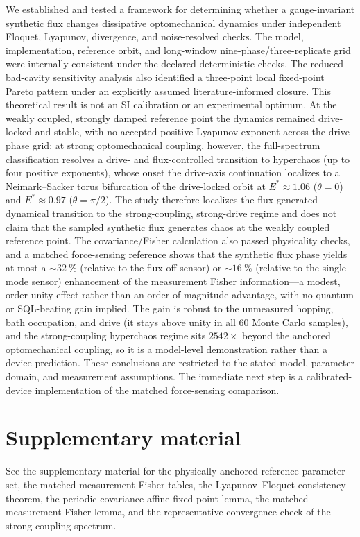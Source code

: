 \documentclass[aip,cha,reprint]{revtex4-2}
\begin{document}
We established and tested a framework for determining whether a
gauge-invariant synthetic flux changes dissipative optomechanical dynamics under
independent Floquet, Lyapunov, divergence, and noise-resolved checks. The model,
implementation, reference orbit, and long-window nine-phase/three-replicate grid were internally consistent under the declared deterministic checks. The reduced bad-cavity sensitivity analysis
also identified a three-point local fixed-point Pareto pattern under an explicitly
assumed literature-informed closure. This theoretical result is not an SI
calibration or an experimental optimum. At the weakly coupled, strongly damped
reference point the dynamics remained drive-locked and stable, with no accepted
positive Lyapunov exponent across the drive--phase grid; at strong optomechanical
coupling, however, the full-spectrum classification resolves a drive- and
flux-controlled transition to hyperchaos (up to four positive exponents), whose
onset the drive-axis continuation localizes to a Neimark--Sacker torus
bifurcation of the drive-locked orbit at $E^{*}\approx\num{1.06}$ ($\theta=0$)
and $E^{*}\approx\num{0.97}$ ($\theta=\pi/2$). The
study therefore localizes the flux-generated dynamical transition to the
strong-coupling, strong-drive regime and does not claim that the sampled
synthetic flux generates chaos at the weakly coupled reference point. The covariance/Fisher calculation also passed physicality checks, and a matched
force-sensing reference shows that the synthetic flux phase yields at most a
$\sim\SI{32}{\percent}$ (relative to the flux-off sensor) or $\sim\SI{16}{\percent}$
(relative to the single-mode sensor) enhancement of the measurement Fisher
information---a modest, order-unity effect rather than an order-of-magnitude
advantage, with no quantum or SQL-beating gain implied. The gain is robust to
the unmeasured hopping, bath occupation, and drive (it stays above unity in all \num{60} Monte Carlo samples), and the strong-coupling hyperchaos regime sits
$\num{2542}\times$ beyond the anchored optomechanical coupling, so it is a
model-level demonstration rather than a device prediction. These conclusions are restricted to the stated model, parameter domain, and measurement
assumptions. The immediate next step is a calibrated-device implementation of
the matched force-sensing comparison.

\section*{Supplementary material}
See the supplementary material for the physically anchored reference parameter set,
the matched measurement-Fisher tables, the Lyapunov--Floquet consistency theorem,
the periodic-covariance affine-fixed-point lemma, the matched-measurement Fisher
lemma, and the representative convergence check of the strong-coupling spectrum.
\end{document}
